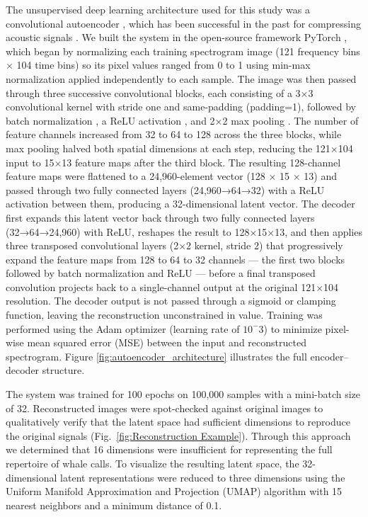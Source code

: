 \documentclass[preprint,NumberedRefs]{JASAnew}
\begin{document}
The unsupervised deep learning architecture used for this study was a convolutional autoencoder \cite{hinton2006reducing}, which has been successful in the past for compressing acoustic signals \cite{ozanich2021deep,chien2023automatic}. We built the system in the open-source framework PyTorch \cite{paszke2019pytorch}, which began by normalizing each training spectrogram image (121 frequency bins × 104 time bins) so its pixel values ranged from 0 to 1 using min-max normalization applied independently to each sample. The image was then passed through three successive convolutional blocks, each consisting of a 3×3 convolutional kernel with stride one and same-padding (padding=1), followed by batch normalization \cite{ioffe2015batch}, a ReLU activation \cite{nair2010rectified}, and 2×2 max pooling \cite{lecun1998gradient}. The number of feature channels increased from 32 to 64 to 128 across the three blocks, while max pooling halved both spatial dimensions at each step, reducing the 121×104 input to 15×13 feature maps after the third block. The resulting 128-channel feature maps were flattened to a 24,960-element vector (128 × 15 × 13) and passed through two fully connected layers (24,960→64→32) with a ReLU activation between them, producing a 32-dimensional latent vector. The decoder first expands this latent vector back through two fully connected layers (32→64→24,960) with ReLU, reshapes the result to 128×15×13, and then applies three transposed convolutional layers (2×2 kernel, stride 2) that progressively expand the feature maps from 128 to 64 to 32 channels — the first two blocks followed by batch normalization and ReLU — before a final transposed convolution projects back to a single-channel output at the original 121×104 resolution. The decoder output is not passed through a sigmoid or clamping function, leaving the reconstruction unconstrained in value. Training was performed using the Adam optimizer \cite{kingma2015adam} (learning rate of $10^-3$) to minimize pixel-wise mean squared error (MSE) between the input and reconstructed spectrogram. Figure \ref{fig:autoencoder_architecture} illustrates the full encoder–decoder structure.

The system was trained for 100 epochs on 100,000 samples with a mini-batch size of 32. Reconstructed images were spot-checked against original images to qualitatively verify that the latent space had sufficient dimensions to reproduce the original signals (Fig.~\ref{fig:Reconstruction Example}). Through this approach we determined that 16 dimensions were insufficient for representing the full repertoire of whale calls. To visualize the resulting latent space, the 32-dimensional latent representations were reduced to three dimensions using the Uniform Manifold Approximation and Projection (UMAP) algorithm \cite{mcinnes2018umap} with 15 nearest neighbors and a minimum distance of 0.1.
\end{document}
